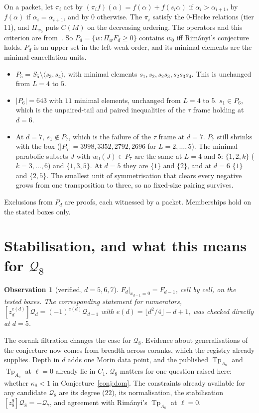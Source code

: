 \documentclass[11pt,a4paper]{article}
\DeclareMathOperator{\Tp}{Tp}
\newcommand{\Qd}{\mathcal{Q}}
\theoremstyle{plain}
\newtheorem{observation}[theorem]{Observation}
\theoremstyle{definition}
\theoremstyle{remark}
\begin{document}
On a packet, let $\pi_i$ act by $(\pi_i f)(\alpha) = f(\alpha) + f(s_i\alpha)$ if $\alpha_i >
\alpha_{i+1}$, by $f(\alpha)$ if $\alpha_i = \alpha_{i+1}$, and by $0$ otherwise. The $\pi_i$ satisfy
the 0-Hecke relations (tier 11), and $\Pi_{w_0}$ puts $C(M)$ on the decreasing ordering. The
operators and this criterion are from~\cite[\S3.3]{FS}. So $P_d = \{w : \Pi_w F_d \ge 0\}$ contains
$w_0$ iff Rim\'anyi's conjecture holds. $P_d$ is an upper set in the left weak order, and its
minimal elements are the minimal cancellation units.



\begin{itemize}[nosep]
\item $P_5 = S_5 \setminus \langle s_3, s_4\rangle$, with minimal elements $s_1, s_2, s_2s_3,
  s_2s_3s_4$. This is unchanged from $L = 4$ to $5$.
\item $|P_6| = 643$ with $11$ minimal elements, unchanged from $L = 4$ to $5$. $s_1 \in P_6$, which
  is the unpaired-tail and paired inequalities of the $\tau$ frame holding at $d = 6$.
\item At $d = 7$, $s_1 \notin P_7$, which is the failure of the $\tau$ frame at $d = 7$. $P_7$
  still shrinks with the box ($|P_7| = 3998, 3352, 2792, 2696$ for $L = 2, \dots, 5$). The minimal
  parabolic subsets $J$ with $w_0(J) \in P_7$ are the same at $L = 4$ and $5$: $\{1,2,k\}$
  ($k = 3, \dots, 6$) and $\{1,3,5\}$. At $d = 5$ they are $\{1\}$ and $\{2\}$, and at $d = 6$
  $\{1\}$ and $\{2,5\}$. The smallest unit of symmetrisation that clears every negative grows
  from one transposition to three, so no fixed-size pairing survives.
\end{itemize}
Exclusions from $P_d$ are proofs, each witnessed by a packet. Memberships hold on the stated boxes
only.

\section{Stabilisation, and what this means for $\Qd_8$}\label{sec:q8}

\begin{observation}[verified, $d = 5, 6, 7$]
$F_d|_{x_{d-1} = 0} = F_{d-1}$, cell by cell, on the tested boxes. The corresponding statement
for numerators, $[z_d^{e(d)}]\Qd_d = (-1)^{e(d)}\Qd_{d-1}$ with $e(d) = \lfloor d^2/4\rfloor - d + 1$,
was checked directly at $d = 5$.
\end{observation}

The corank filtration changes the case for $\Qd_8$. Evidence about generalisations of the
conjecture now comes from breadth across coranks, which the registry already supplies. Depth in
$d$ adds one Morin data point, and the published $\Tp_{A_8}$ and $\Tp_{A_9}$ at $\ell = 0$ already
lie in $C_1$. $\Qd_8$ matters for one question raised here: whether $\kappa_8 < 1$ in
Conjecture~\ref{conj:dom}. The constraints already available for any candidate $\Qd_8$ are its
degree ($22$), its normalisation, the stabilisation $[z_8^{9}]\Qd_8 = -\Qd_7$, and agreement with
Rim\'anyi's $\Tp_{A_8}$ at $\ell = 0$.
\end{document}
